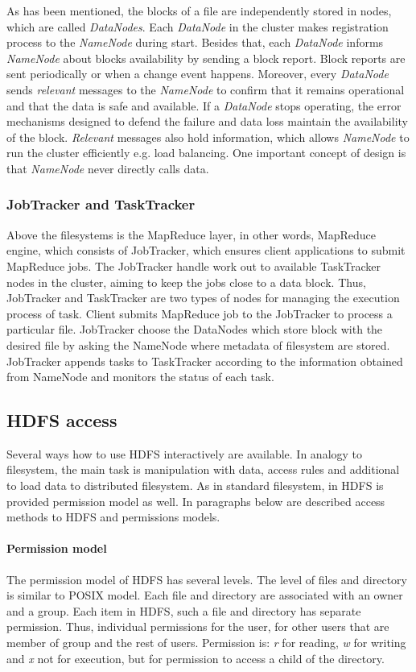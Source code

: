 \documentclass[a4paper,12pt,oneside]{report}
\begin{document}
	As has been mentioned, the blocks of a file are independently stored in nodes,
	which are called
	\textit{DataNodes}. Each \textit{DataNode} in the cluster makes registration
	process to the \textit{NameNode} during start. 
	Besides that, each \textit{DataNode} informs \textit{NameNode} about blocks
	availability by sending a block report. 
	Block reports are sent periodically or when a change event happens. Moreover,
	every \textit{DataNode} sends 
	\emph{relevant} messages to the \textit{NameNode} to confirm that
	it remains operational and that the data is safe and available. If a
	\textit{DataNode} stops operating, the error 
	mechanisms designed to defend the failure and data loss maintain the
	availability of the block.
	\emph{Relevant} messages also hold information, which allows \textit{NameNode}
	to run the cluster efficiently e.g. 
	load balancing. One important concept of design  is that \textit{NameNode} never
	directly calls data.
	
	
	\subsubsection{JobTracker and TaskTracker}
	Above the filesystems is  the MapReduce layer, in other words, MapReduce engine,
	which consists of 
	JobTracker,  which ensures client applications to submit Map\-Reduce jobs. The
	JobTracker handle work 
	out to available TaskTracker nodes in the cluster, 
	aiming to keep the jobs close to a data block.  Thus, JobTracker and TaskTracker
	are two types of 
	nodes for managing the execution process of  task.
	Client submits MapReduce job  to the JobTracker to process a particular file.
	JobTracker choose the 
	DataNodes which store block with the desired file by asking the NameNode where 
	metadata of filesystem are stored. 
	JobTracker appends tasks to TaskTracker according to the  information obtained
	from NameNode and monitors the status of each task.
	
	
	\subsection{HDFS access} 
	Several ways how to use HDFS interactively are available. In analogy to
	filesystem, the main task is manipulation with data, access rules and additional
	to load data to distributed filesystem. As in standard filesystem, in HDFS is
	provided permission model as well. In paragraphs below are described access
	methods to HDFS and permissions models.
	
	\paragraph{Permission model}
	The permission model of HDFS has several levels. The level of files and
	directory is similar to POSIX model. Each file and directory are associated with
	an owner and a group. Each item in HDFS, such a file and directory has separate
	permission. Thus, individual permissions for the user, for other users that are
	member of group and the rest of users. Permission is: \textit{r} for reading,
	\textit{w} for writing and \textit{x} not for execution, but for permission to
	access a child of the directory.\cite{permission}
	
\end{document}
